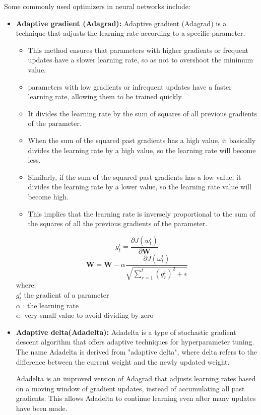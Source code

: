 \begin{itemize}
Some commonly used optimizers in neural networks include:
\begin{itemize}
    \item \textbf{Adaptive gradient (Adagrad): } Adaptive gradient (Adagrad) is a technique that adjusts the learning rate according to a specific parameter. 
\begin{itemize}
    \item This method ensures that parameters with higher gradients or frequent updates have a slower learning rate, so as not to overshoot the minimum value.
    \item parameters with low gradients or infrequent updates have a faster learning rate, allowing them to be trained quickly.
    \item  It divides the learning rate by the sum of squares of all previous gradients of the parameter.
    \item When the sum of the squared past gradients has a high value, it basically divides the learning rate by a high value, so the learning rate will become less.
    \item Similarly, if the sum of the squared past gradients has a low value, it divides the learning rate by a lower value, so the learning rate value will become high.
    \item This implies that the learning rate is inversely proportional to the sum of the squares of all the previous gradients of the parameter.
    \end{itemize}
    \[
    g_{t}^{i}=\frac{\partial J(w_{t}^{i})}{\partial \mathbf{W}}
    \]
    \[
    \mathbf{W}=\mathbf{W}-\alpha\frac{\partial J(\omega_{t}^{t})}{\sqrt{\sum_{r=1}^{t}(g_{r}^{i})^2+\epsilon}}
    \]
    where: \\
     $g_{t}^{i}$  the gradient of a parameter\\
    $\alpha$ : the learning rate\\
    $\epsilon: $ very small value to avoid dividing by zero
    
    \item \textbf{Adaptive delta(Adadelta): } Adadelta is a type of stochastic gradient descent algorithm that offers adaptive techniques for hyperparameter tuning. The name Adadelta is derived from "adaptive delta", where delta refers to the difference between the current weight and the newly updated weight.

    Adadelta is an improved version of Adagrad that adjusts learning rates based on a moving window of gradient updates, instead of accumulating all past gradients. This allows Adadelta to continue learning even after many updates have been made.
    

\end{itemize}
\end{itemize}
